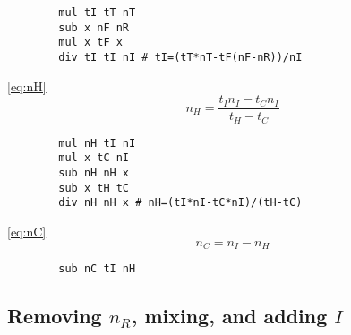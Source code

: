 \documentclass{article}
\begin{document}
\begin{paracol}{2}
    \switchcolumn
    \vspace{-1em}
    \begin{verbatim}
        mul tI tT nT
        sub x nF nR
        mul x tF x
        div tI tI nI # tI=(tT*nT-tF(nF-nR))/nI
    \end{verbatim}
    \switchcolumn*
    \noindent
    \autoref{eq:nH}
    \[
        n_H = \frac{t_I n_I-t_C n_I}{t_H-t_C}
    \]
    \switchcolumn
    \vspace{-1em}
    \begin{verbatim}
        mul nH tI nI
        mul x tC nI
        sub nH nH x
        sub x tH tC
        div nH nH x # nH=(tI*nI-tC*nI)/(tH-tC)
    \end{verbatim}
    \switchcolumn*
    \noindent
    \autoref{eq:nC}
    \[
        n_C = n_I-n_H
    \]
    \switchcolumn
    \vspace{-1em}
    \begin{verbatim}
        sub nC tI nH
    \end{verbatim}
\end{paracol}

\subsection{Removing $n_R$, mixing, and adding $I$}
\end{document}
